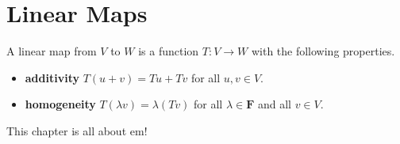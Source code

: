 \clearpage
\section{Linear Maps}

A linear map from $V$ to $W$ is a function $T : V \to W$ with the following
properties.

\begin{itemize}
\item \textbf{additivity} $T(u + v) = Tu + Tv$ for all $u, v \in V$.
\item \textbf{homogeneity} $T(\lambda v) = \lambda(Tv)$ for all $\lambda \in \mathbf{F}$ and all $v \in V$.
\end{itemize}

This chapter is all about em!











